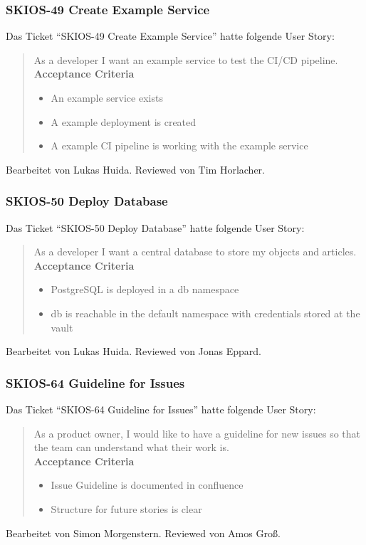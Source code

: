 \subsubsection{SKIOS-49 Create Example Service}
Das Ticket \enquote{SKIOS-49 Create Example Service} hatte folgende User Story:
\begin{quotation}
    As a developer I want an example service to test the CI/CD pipeline. \\
    \textbf{Acceptance Criteria}
    \begin{itemize}
        \item An example service exists
        \item A example deployment is created
        \item A example CI pipeline is working with the example service
    \end{itemize}
\end{quotation}
Bearbeitet von Lukas Huida.
Reviewed von Tim Horlacher.

\subsubsection{SKIOS-50 Deploy Database}
Das Ticket \enquote{SKIOS-50 Deploy Database} hatte folgende User Story:
\begin{quotation}
    As a developer I want a central database to store my objects and articles. \\
    \textbf{Acceptance Criteria}
    \begin{itemize}
        \item PostgreSQL is deployed in a db namespace
        \item db is reachable in the default namespace with credentials stored at the vault
    \end{itemize}
\end{quotation}
Bearbeitet von Lukas Huida.
Reviewed von Jonas Eppard.

\subsubsection{SKIOS-64 Guideline for Issues}
Das Ticket \enquote{SKIOS-64 Guideline for Issues} hatte folgende User Story:
\begin{quotation}
    As a product owner, I would like to have a guideline for new issues so that the team can understand what their work is. \\
\textbf{Acceptance Criteria}
\begin{itemize}
    \item Issue Guideline is documented in confluence
    \item Structure for future stories is clear
\end{itemize}
\end{quotation}
Bearbeitet von Simon Morgenstern.
Reviewed von Amos Groß.

